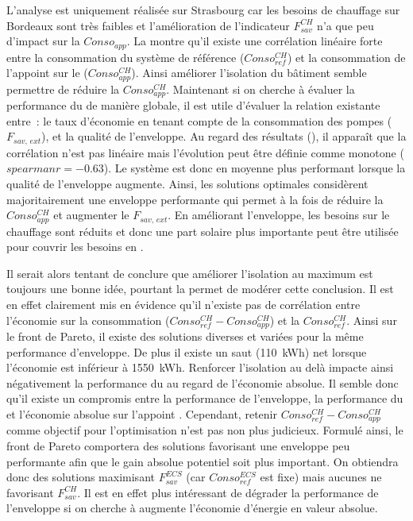 L’analyse est uniquement réalisée sur Strasbourg car les besoins de chauffage sur Bordeaux
sont très faibles et l’amélioration de l’indicateur $F_{sav}^{CH}$ n’a que peu d’impact sur
la $Conso_{app}$. La  montre qu’il existe une corrélation linéaire forte entre la
consommation du système de référence ($Conso_{ref}^{CH}$) et la consommation de l’appoint sur
le  ($Conso_{app}^{CH}$). Ainsi améliorer l’isolation du bâtiment semble permettre
de réduire la $Conso_{app}^{CH}$. Maintenant si on cherche à évaluer la performance du
 de manière globale, il est utile d’évaluer la relation existante entre~:
le taux d’économie en tenant compte de la consommation des pompes ($F_{sav,\,ext}$), et
la qualité de l’enveloppe. Au regard des résultats (),
il apparaît que la corrélation n’est pas linéaire mais l’évolution peut être définie
comme monotone ($spearmanr = \num{-0.63}$). Le système est donc en moyenne plus performant
lorsque la qualité de l’enveloppe augmente. Ainsi, les solutions optimales
considèrent majoritairement une enveloppe performante qui permet à la fois de réduire
la $Conso_{app}^{CH}$ et augmenter le $F_{sav,\,ext}$. En améliorant l’enveloppe, les besoins
sur le chauffage sont réduits et donc une part solaire plus importante peut être
utilisée pour couvrir les besoins en .

Il serait alors tentant de conclure que améliorer l’isolation au maximum est
toujours une bonne idée, pourtant la  permet
de modérer cette conclusion. Il est en effet clairement mis en évidence
qu’il n’existe pas de corrélation entre l’économie sur la consommation
($Conso_{ref}^{CH} - Conso_{app}^{CH}$) et la $Conso_{ref}^{CH}$. Ainsi sur le front de Pareto, il existe des solutions diverses
et variées pour la même performance d’enveloppe. De plus il existe un saut (\SI{110}{kWh})
net lorsque l’économie est inférieur à \SI{1550}{kWh}. Renforcer l’isolation
au delà impacte ainsi négativement la performance du  au regard de l’économie
absolue. Il semble donc qu’il existe un compromis entre la performance de l’enveloppe,
la performance du  et l’économie absolue sur l’appoint .
Cependant, retenir $Conso_{ref}^{CH} - Conso_{app}^{CH}$ comme objectif
pour l’optimisation n’est pas non plus judicieux. Formulé ainsi, le front de Pareto
comportera des solutions favorisant une enveloppe peu performante afin que le gain
absolue potentiel soit plus important. On obtiendra donc des solutions
maximisant $F_{sav}^{ECS}$ (car $Conso_{ref}^{ECS}$ est fixe) mais aucunes ne
favorisant $F_{sav}^{CH}$. Il est en effet plus intéressant de dégrader la performance
de l’enveloppe si on cherche à augmente l’économie d’énergie en valeur absolue.

